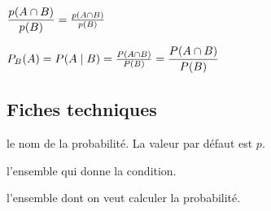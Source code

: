 \documentclass[12pt,a4paper]{article}
\begin{document}
\begin{latexex}
 $\eprobacond {B}{A}
= \eprobacond*{B}{A}$
\end{latexex}





\begin{latexex}
 $\probacond  [P]{B}{A}
= \probacond* [P]{B}{A}
= \eprobacond*[P]{B}{A}
= \eprobacond [P]{B}{A}$
\end{latexex}




\subsection{Fiches techniques}



\extraspace




\IDoption{} le nom de la probabilité. La valeur par défaut est $p$.

 l'ensemble qui donne la condition.

 l'ensemble dont on veut calculer la probabilité.
\end{document}
